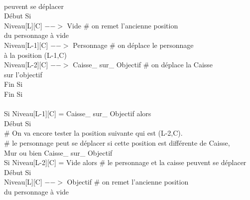 \documentclass{article}
\begin{document}
\begin{tabbing}
\\ \hspace{4cm} peuvent se déplacer
\\	\hspace{4cm}		Début Si
\\	\hspace{5cm}		Niveau[L][C] $-->$ Vide 			\# on remet l'ancienne position
\\ \hspace{5cm} du personnage à vide
\\	\hspace{5cm}		Niveau[L-1][C] $-->$ Personnage		\# on déplace le personnage
\\ \hspace{5cm} à la position (L-1,C)
\\	\hspace{5cm}			Niveau[L-2][C] $-->$ Caisse\_ sur\_ Objectif	\# on déplace la Caisse
\\ \hspace{5cm} sur l'objectif
\\	\hspace{4cm}		Fin Si
\\	\hspace{3cm}	Fin Si 
\\		
\\	\hspace{3cm}	Si Niveau[L-1][C] = Caisse\_ sur\_ Objectif alors			
\\	\hspace{3cm}		Début Si
\\	\hspace{4cm}			\# On va encore tester la position suivante qui est (L-2,C). 
\\	\hspace{4cm}			\# le personnage peut se déplacer si cette position est différente de Caisse,
\\ \hspace{4cm} Mur ou bien Caisse\_ sur\_ Objectif
\\	\hspace{4cm}			Si Niveau[L-2][C] = Vide alors          		\# le personnage et la caisse peuvent se déplacer
\\	\hspace{4cm}			Début Si
\\	\hspace{5cm}				Niveau[L][C] $-->$ Objectif			\# on remet l'ancienne position
\\ \hspace{5cm} du personnage à vide

\end{tabbing}
\end{document}
